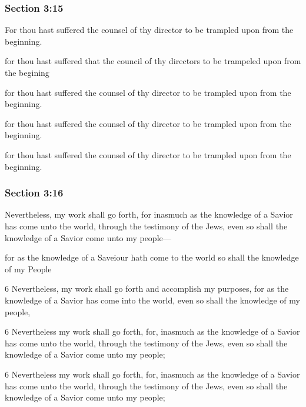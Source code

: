 	\subsubsection{Section 3:15} %
		\label{DC3-15}

		For thou hast suffered the counsel of thy director to be trampled upon from the beginning.

		\begin{framed}
		\scriptsize
			\begin{compactdesc}
				\item[JSP] for thou hast suffered that the council of thy directors to be trampeled upon from the begining
				\item[BC] for thou hast suffered the counsel of thy director to be trampled upon from the beginning.
				\item[DC 1835] for thou hast suffered the counsel of thy director to be trampled upon from the beginning.
				\item[DC 1844] for thou hast suffered the counsel of thy director to be trampled upon from the beginning.
			\end{compactdesc}
		\end{framed}

	\subsubsection{Section 3:16} %
		\label{DC3-16}

		Nevertheless, my work shall go forth, for inasmuch as the knowledge of a Savior has come unto the world, through the testimony of the Jews, even so shall the knowledge of a Savior come unto my people---

		\begin{framed}
		\scriptsize
			\begin{compactdesc}
				\item[JSP] for as the knowledge of a Saveiour hath come to the world so shall the knowledge of my People
				\item[BC] 6 Nevertheless, my work shall go forth and accomplish my purposes, for as the knowledge of a Savior has come into the world, even so shall the knowledge of my people, 
				\item[DC 1835] 6 Nevertheless my work shall go forth, for, inasmuch as the knowledge of a Savior has come unto the world, through the testimony of the Jews, even so shall the knowledge of a Savior come unto my people; 
				\item[DC 1844] 6 Nevertheless my work shall go forth, for, inasmuch as the knowledge of a Savior has come unto the world, through the testimony of the Jews, even so shall the knowledge of a Savior come unto my people;
			\end{compactdesc}
		\end{framed}

